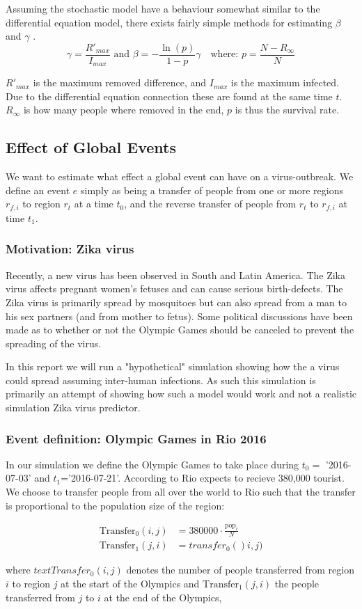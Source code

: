 Assuming the stochastic model have a behaviour somewhat similar to the differential equation model, there exists fairly simple methods for estimating $\beta$ and $\gamma$ \cite{wiki-sir}.
\begin{equation}
\gamma = \frac{R'_{max}}{I_{max}} \text{ and } \beta = -\frac{\ln(p)}{1 - p} \gamma \quad \text{where: } p = \frac{N - R_\infty}{N} 
\end{equation}

$R'_{max}$ is the maximum removed difference, and $I_{max}$ is the maximum infected. Due to the differential equation connection these are found at the same time $t$. $R_\infty$ is how many people where removed in the end, $p$ is thus the survival rate.

\subsection{Effect of Global Events}
We want to estimate what effect a global event can have on a virus-outbreak. We define an event $e$ simply as being a transfer of people from one or more regions $r_{f, i}$ to region $r_t$ at a time $t_0$, and the reverse transfer of people from $r_t$ to $r_{f, i}$ at time $t_1$.

\subsubsection{Motivation: Zika virus}
Recently, a new virus has been observed in South and Latin America. The Zika virus affects pregnant women's fetuses and can cause serious birth-defects. The Zika virus is primarily spread by mosquitoes but can also spread from a man to his sex partners (and from mother to fetus). Some political discussions have been made as to whether or not the Olympic Games should be canceled to prevent the spreading of the virus.

In this report we will run a "hypothetical" simulation showing how the a virus could spread assuming inter-human infections. As such this simulation is primarily an attempt of showing how such a model would work and not a realistic simulation Zika virus predictor.

\subsubsection{Event definition: Olympic Games in Rio 2016}
In our simulation we define the Olympic Games to take place during $t_0=$ '2016-07-03' and $t_1$='2016-07-21'. According to \cite{theguardian-olympics} Rio expects to recieve 380,000 tourist. We choose to transfer people from all over the world to Rio such that the transfer is proportional to the population size of the region:

\begin{align}
	\text{Transfer}_0(i, j) &= 380000 \cdot \frac{ \text{pop}_i}{N} \\
	\text{Transfer}_1(j, i) &= transfer_0()i, j)
\end{align}

where $text{Transfer}_0(i, j) $ denotes the number of people transferred from region $i$ to region $j$ at the start of the Olympics and $ \text{Transfer}_1(j, i) $ the people transferred from $j$ to $i$ at the end of the Olympics,
